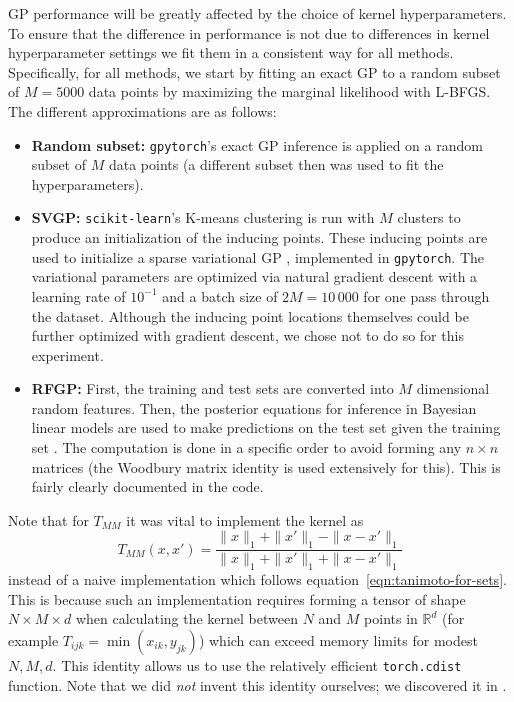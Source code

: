 GP performance will be greatly affected by the choice of kernel hyperparameters.
To ensure that the difference in performance is not due to differences in kernel hyperparameter settings
we fit them in a consistent way for all methods.
Specifically,
for all methods,
we start by fitting an exact GP to a random subset of $M=5000$ data points by maximizing the marginal likelihood with L-BFGS.
The different approximations are as follows:
\begin{itemize}
    \item \textbf{Random subset:}
        \texttt{gpytorch}'s exact GP inference is applied on a random subset of $M$ data points
        (a different subset then was used to fit the hyperparameters).
    \item \textbf{SVGP:}
        \texttt{scikit-learn}'s K-means clustering is run with $M$ clusters to produce an initialization of the inducing points.
        These inducing points are used to initialize a sparse variational GP \citep{hensman2013gaussian},
        implemented in \texttt{gpytorch}.
        The variational parameters are optimized via natural gradient descent with a learning rate of $10^{-1}$
        and a batch size of $2M=10\,000$ for one pass through the dataset.
        Although the inducing point locations themselves could be further optimized with gradient descent,
        we chose not to do so for this experiment.
    \item \textbf{RFGP:}
        First, the training and test sets are converted into $M$ dimensional random features.
        Then, the posterior equations for inference in Bayesian linear models
        are used to make predictions on the test set given the training set \citep[equations 3.49--3.51]{bishop2006pattern}.
        The computation is done in a specific order to avoid forming any $n\times n$ matrices
        (the Woodbury matrix identity is used extensively for this).
        This is fairly clearly documented in the code.
\end{itemize}

Note that for $T_{MM}$ it was vital to implement the kernel as
\begin{equation}\label{eqn:minmax-using-l1-distance}
    T_{MM}(x, x') = \frac{\|x\|_1+\|x'\|_1 - \|x-x'\|_1}{\|x\|_1+\|x'\|_1 + \|x-x'\|_1}
\end{equation}
instead of a naive implementation which follows equation~\ref{eqn:tanimoto-for-sets}.
This is because such an implementation requires forming a tensor of shape $N\times M \times d$
when calculating the kernel between $N$ and $M$ points in $\mathbb{R}^d$
(for example $T_{ijk}=\min(x_{ik}, y_{jk})$)
which can exceed memory limits for modest $N,M,d$.
This identity allows us to use the relatively efficient \texttt{torch.cdist} function.
Note that we did \emph{not} invent this identity ourselves;
we discovered it in \citet{ioffe2010improved}.

